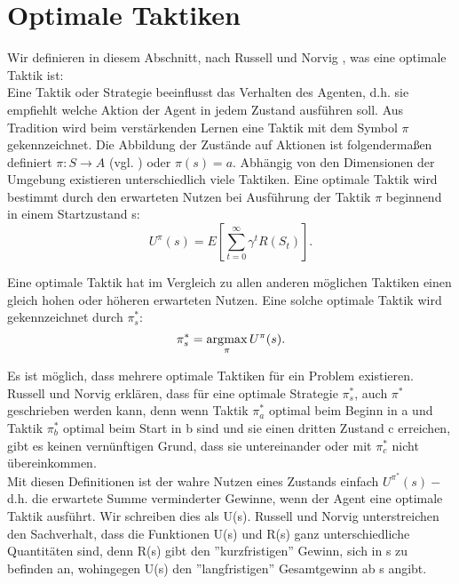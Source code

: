 \section{Optimale Taktiken}
\label{sec:Optimale Taktiken}
Wir definieren in diesem Abschnitt, nach Russell und Norvig \cite[757\psq]{Russell}, was eine optimale Taktik ist: \\
Eine Taktik oder Strategie beeinflusst das Verhalten des Agenten, d.h. sie empfiehlt welche Aktion der Agent in jedem Zustand ausführen soll. Aus Tradition wird beim verstärkenden Lernen eine Taktik mit dem Symbol $\pi$ gekennzeichnet. Die Abbildung der Zustände auf Aktionen ist folgendermaßen definiert $\pi : S \rightarrow A$ (vgl. \cite[290]{Ertel}) oder $\pi(s) = a$. Abhängig von den Dimensionen der Umgebung existieren unterschiedlich viele Taktiken. Eine optimale Taktik wird bestimmt durch den erwarteten Nutzen bei Ausführung der Taktik $\pi$ beginnend in einem Startzustand s:\\

\begin{equation}
\label{eq:Der erwartete Nutzen}
U^\pi(s) = E\left[\sum_{t=0}^{\infty} \gamma^t R(S_t)\right].
\end{equation}

Eine optimale Taktik hat im Vergleich zu allen anderen möglichen Taktiken einen gleich hohen oder höheren erwarteten Nutzen. Eine solche optimale Taktik wird gekennzeichnet durch $\pi^*_s$: \\ 

\begin{equation}
\pi^*_s = \operatorname*{arg\!\max}_\pi U^\pi(s).
\end{equation}

Es ist möglich, dass mehrere optimale Taktiken für ein Problem existieren. Russell und Norvig erklären, dass für eine optimale Strategie $\pi^*_s$, auch $\pi^*$ geschrieben werden kann, denn wenn Taktik $\pi^*_a$ optimal beim Beginn in a und Taktik $\pi^*_b$ optimal beim Start in b sind und sie einen dritten Zustand c erreichen, gibt es keinen vernünftigen Grund, dass sie untereinander oder mit $\pi^*_c$ nicht übereinkommen. \\

Mit diesen Definitionen ist der wahre Nutzen eines Zustands einfach $U^{\pi^*}(s) -$ d.h. die erwartete Summe verminderter Gewinne, wenn der Agent eine optimale Taktik ausführt. Wir schreiben dies als U(s). Russell und Norvig unterstreichen den Sachverhalt, dass die Funktionen U(s) und R(s) ganz unterschiedliche Quantitäten sind, denn R(s) gibt den ''kurzfristigen'' Gewinn, sich in s zu befinden an, wohingegen U(s) den ''langfristigen'' Gesamtgewinn ab s angibt.


